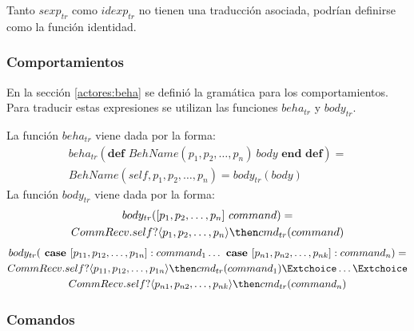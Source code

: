 Tanto $sexp_{tr}$ como $idexp_{tr}$ no tienen una traducción asociada, podrían definirse como la función identidad.

\subsubsection*{Comportamientos}
En la sección \ref{actores:beha} se definió la gramática para los comportamientos. Para traducir estas expresiones se utilizan las funciones $beha_{tr}$ y $body_{tr}$.

La función $beha_{tr}$ viene dada por la forma:
\begin{multline*}
beha_{tr}(\textbf{def } BehName(p_1, p_2,\ldots, p_n)\ body \textbf{ end def}) = \\
BehName(self, p_1, p_2,\ldots, p_n) = body_{tr}(body) 
\end{multline*}
La función $body_{tr}$ viene dada por la forma:
\begin{multline*}
body_{tr}([ p_1, p_2,\ldots, p_n]\ command) = \\
 CommRecv.self?\langle p_1, p_2,\ldots, p_n \rangle \then cmd_{tr}(command)
\end{multline*}
\begin{multline*}
body_{tr}(\textbf{ case } [p_{11}, p_{12},\ldots, p_{1n}]: command_1 \ldots \textbf{ case } [p_{n1}, p_{n2},\ldots, p_{nk}]: command_n ) = \\
CommRecv.self?\langle p_{11}, p_{12},\ldots, p_{1n} \rangle \then cmd_{tr}(command_1) \Extchoice \ldots \Extchoice \\
CommRecv.self?\langle p_{n1}, p_{n2},\ldots, p_{nk} \rangle \then cmd_{tr}(command_n) 
\end{multline*}

\subsubsection*{Comandos}


